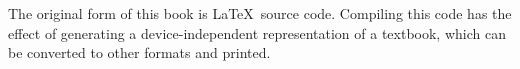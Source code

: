 \documentclass[11pt]{book}
\newcommand{\thisgls}{temp}  %
\begin{document}
The original form of this book is \LaTeX\ source code.  Compiling this
code has the effect of generating a device-independent representation
of a textbook, which can be converted to other formats and printed.


\setcounter{tocdepth}{1}
\tableofcontents

\mainmatter


\renewcommand{\thisgls}{dataacq}


\printglossary[type=\thisgls]
\glsresetall

\renewcommand{\thisgls}{measure}


\printglossary[type=\thisgls]
\glsresetall

\renewcommand{\thisgls}{model1}


\printglossary[type=\thisgls]
\glsresetall

\renewcommand{\thisgls}{compare}


\printglossary[type=\thisgls]
\glsresetall

%
%






\end{document}
